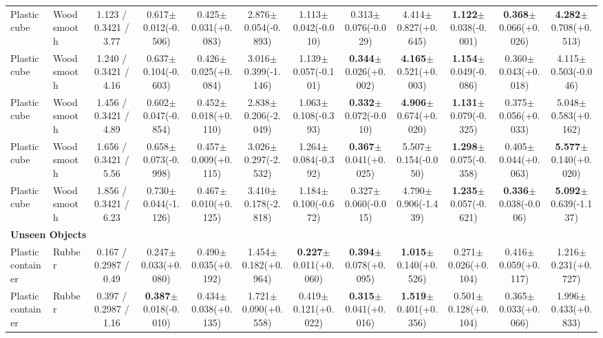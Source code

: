 \begin{table}[t]
{\begin{tabular}{l l c c c c c c c c c c }
        Plastic cube & Wood smooth & 1.123 / 0.3421 / 3.77 & 0.617$\pm$0.012(-0.506) & 0.425$\pm$0.031(+0.083) & 2.876$\pm$0.054(-0.893) & 1.113$\pm$0.042(-0.010) & 0.313$\pm$0.076(-0.029) & 4.414$\pm$0.827(+0.645) & \textbf{1.122}$\pm$0.038(-0.001) & \textbf{0.368}$\pm$0.066(+0.026) & \textbf{4.282}$\pm$0.708(+0.513) \\
        Plastic cube & Wood smooth & 1.240 / 0.3421 / 4.16 & 0.637$\pm$0.104(-0.603) & 0.426$\pm$0.025(+0.084) & 3.016$\pm$0.399(-1.146) & 1.139$\pm$0.057(-0.101) & \textbf{0.344}$\pm$0.026(+0.002) & \textbf{4.165}$\pm$0.521(+0.003) & \textbf{1.154}$\pm$0.049(-0.086) & 0.360$\pm$0.043(+0.018) & 4.115$\pm$0.503(-0.046) \\
        Plastic cube & Wood smooth & 1.456 / 0.3421 / 4.89 & 0.602$\pm$0.047(-0.854) & 0.452$\pm$0.018(+0.110) & 2.838$\pm$0.206(-2.049) & 1.063$\pm$0.108(-0.393) & \textbf{0.332}$\pm$0.072(-0.010) & \textbf{4.906}$\pm$0.674(+0.020) & \textbf{1.131}$\pm$0.079(-0.325) & 0.375$\pm$0.056(+0.033) & 5.048$\pm$0.583(+0.162) \\
        Plastic cube & Wood smooth & 1.656 / 0.3421 / 5.56 & 0.658$\pm$0.073(-0.998) & 0.457$\pm$0.009(+0.115) & 3.026$\pm$0.297(-2.532) & 1.264$\pm$0.084(-0.392) & \textbf{0.367}$\pm$0.041(+0.025) & 5.507$\pm$0.154(-0.050) & \textbf{1.298}$\pm$0.075(-0.358) & 0.405$\pm$0.044(+0.063) & \textbf{5.577}$\pm$0.140(+0.020) \\
        Plastic cube & Wood smooth & 1.856 / 0.3421 / 6.23 & 0.730$\pm$0.044(-1.126) & 0.467$\pm$0.010(+0.125) & 3.410$\pm$0.178(-2.818) & 1.184$\pm$0.100(-0.672) & 0.327$\pm$0.060(-0.015) & 4.790$\pm$0.906(-1.439) & \textbf{1.235}$\pm$0.057(-0.621) & \textbf{0.336}$\pm$0.038(-0.006) & \textbf{5.092}$\pm$0.639(-1.137) \\
        \midrule
        \multicolumn{12}{l}{\textbf{Unseen Objects}} \\
        \midrule
        Plastic container & Rubber & 0.167 / 0.2987 / 0.49 & 0.247$\pm$0.033(+0.080) & 0.490$\pm$0.035(+0.192) & 1.454$\pm$0.182(+0.964) & \textbf{0.227}$\pm$0.011(+0.060) & \textbf{0.394}$\pm$0.078(+0.095) & \textbf{1.015}$\pm$0.140(+0.526) & 0.271$\pm$0.026(+0.104) & 0.416$\pm$0.059(+0.117) & 1.216$\pm$0.231(+0.727) \\
        Plastic container & Rubber & 0.397 / 0.2987 / 1.16 & \textbf{0.387}$\pm$0.018(-0.010) & 0.434$\pm$0.038(+0.135) & 1.721$\pm$0.090(+0.558) & 0.419$\pm$0.121(+0.022) & \textbf{0.315}$\pm$0.041(+0.016) & \textbf{1.519}$\pm$0.401(+0.356) & 0.501$\pm$0.128(+0.104) & 0.365$\pm$0.033(+0.066) & 1.996$\pm$0.433(+0.833) \\

\end{tabular}}
\end{table}
